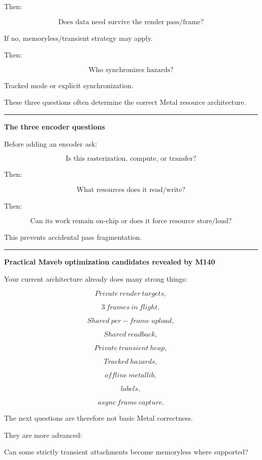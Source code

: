 Then:

\[
\boxed{
\text{Does data need survive the render pass/frame?}
}
\]

If no, memoryless/transient strategy may apply.

Then:

\[
\boxed{
\text{Who synchronizes hazards?}
}
\]

Tracked mode or explicit synchronization.

These three questions often determine the correct Metal resource architecture.

\begin{center}\rule{0.5\linewidth}{0.5pt}\end{center}

\textbf{The three encoder questions}

Before adding an encoder ask:

\[
\boxed{
\text{Is this rasterization, compute, or transfer?}
}
\]

Then:

\[
\boxed{
\text{What resources does it read/write?}
}
\]

Then:

\[
\boxed{
\text{Can its work remain on-chip or does it force resource store/load?}
}
\]

This prevents accidental pass fragmentation.

\begin{center}\rule{0.5\linewidth}{0.5pt}\end{center}

\textbf{Practical Maveb optimization candidates revealed by M140}

Your current architecture already does many strong things:

\[
Private\ render\ targets,
\]

\[
3\ frames\ in\ flight,
\]

\[
Shared\ per-frame\ upload,
\]

\[
Shared\ readback,
\]

\[
Private\ transient\ heap,
\]

\[
Tracked\ hazards,
\]

\[
offline\ metallib,
\]

\[
labels,
\]

\[
async\ frame\ capture.
\]

The next questions are therefore not basic Metal correctness.

They are more advanced:

Can some strictly transient attachments become memoryless where supported?

